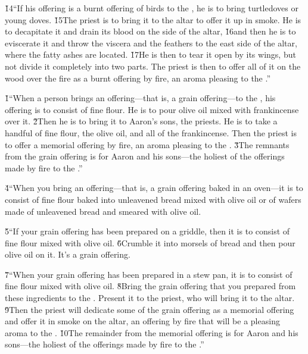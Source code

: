 \v{14}``If his offering is a burnt offering of birds to the , he is to bring turtledoves or young doves. \v{15}The priest is to bring it to the altar to offer it up in smoke. He is to decapitate it and drain its blood on the side of the altar, \v{16}and then he is to eviscerate it and throw the viscera and the feathers to the east side of the altar, where the fatty ashes are located. \v{17}He is then to tear it open by its wings, but not divide it completely into two parts. The priest is then to offer all of it on the wood over the fire as a burnt offering by fire, an aroma pleasing to the .''

\v{1}``When a person brings an offering---that is, a grain offering---to the , his offering is to consist of fine flour. He is to pour olive oil mixed with frankincense over it. \v{2}Then he is to bring it to Aaron's sons, the priests. He is to take a handful of fine flour, the olive oil, and all of the frankincense. Then the priest is to offer a memorial offering by fire, an aroma pleasing to the . \v{3}The remnants from the grain offering is for Aaron and his sons---the holiest of the offerings made by fire to the .''

\v{4}``When you bring an offering---that is, a grain offering baked in an oven---it is to consist of fine flour baked into unleavened bread mixed with olive oil or of wafers made of unleavened bread and smeared with olive oil.

\v{5}``If your grain offering has been prepared on a griddle, then it is to consist of fine flour mixed with olive oil. \v{6}Crumble it into morsels of bread and then pour olive oil on it. It's a grain offering.

\v{7}``When your grain offering has been prepared in a stew pan, it is to consist of fine flour mixed with olive oil. \v{8}Bring the grain offering that you prepared from these ingredients to the . Present it to the priest, who will bring it to the altar. \v{9}Then the priest will dedicate some of the grain offering as a memorial offering and offer it in smoke on the altar, an offering by fire that will be a pleasing aroma to the . \v{10}The remainder from the memorial offering is for Aaron and his sons---the holiest of the offerings made by fire to the .''

